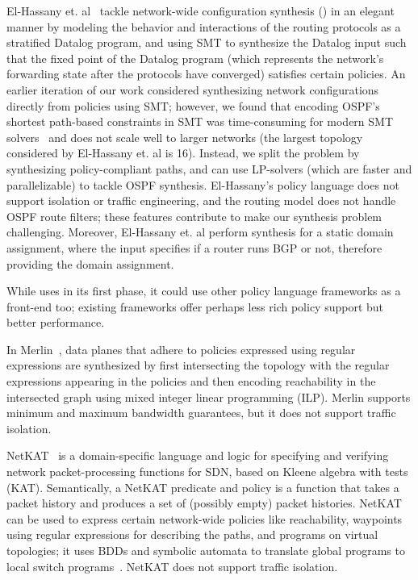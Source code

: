 El-Hassany et. al~\cite{synet} tackle network-wide configuration
synthesis () in an elegant manner by
modeling the behavior and interactions of the routing protocols as a
stratified Datalog program, and using SMT to synthesize the Datalog
input such that the fixed point of the Datalog program (which
represents the network's forwarding state after the protocols have
converged) satisfies certain policies.  An earlier iteration of our
work considered synthesizing network configurations directly from
policies using SMT; however, we found that encoding OSPF's shortest
path-based constraints in SMT was time-consuming for modern SMT
solvers~\cite{z3} and does not scale well to larger networks (the
largest topology considered by El-Hassany et. al is 16). Instead, we
split the problem by synthesizing policy-compliant paths, and can use
LP-solvers (which are faster and parallelizable) to tackle OSPF
synthesis.  El-Hassany's policy language does not support isolation or
traffic engineering, and the routing model does not handle OSPF route filters; 
these features contribute to make our synthesis problem challenging.  
Moreover, El-Hassany et. al perform synthesis for a
static domain assignment, where the input specifies if a router runs
BGP or not, therefore providing the domain assignment.

 While \name uses \genesis in its first
phase, it could use other policy language frameworks as a front-end
too; existing frameworks offer perhaps less rich policy support but better
performance. %

In Merlin~\cite{merlin}, data planes that adhere to policies expressed
using regular expressions are synthesized by first intersecting the
topology with the regular expressions appearing in the policies and
then encoding reachability in the intersected graph using mixed
integer linear programming (ILP).  Merlin supports minimum and maximum
bandwidth guarantees, but it does not support traffic isolation.

NetKAT~\cite{netkat} is a domain-specific language and logic for 
specifying and verifying network packet-processing functions
for SDN, based on Kleene algebra with tests (KAT). Semantically,
a NetKAT predicate and policy is a function that takes a packet
history and produces a set of (possibly empty) packet histories. 
NetKAT can be used to express certain network-wide policies like 
reachability, waypoints using regular expressions for describing the paths, 
and programs on virtual topologies; it uses
BDDs and symbolic automata to translate global programs to local
switch programs~\cite{netkatcompiler}.
NetKAT  does not support traffic isolation.

